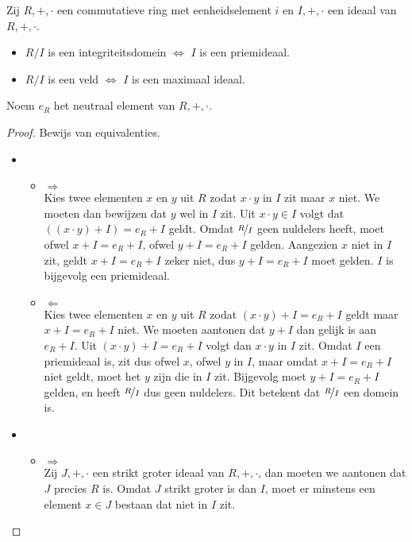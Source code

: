 \documentclass[main.tex]{subfiles}
\begin{document}
\begin{st}
  Zij $R,+,\cdot$ een commutatieve ring met eenheidselement $i$ en $I,+,\cdot$ een ideaal van $R,+,\cdot$.
  \begin{itemize}
  \item $R/I$ is een integriteitsdomein $\Leftrightarrow$ $I$ is een priemideaal.
  \item $R/I$ is een veld $\Leftrightarrow$ $I$ is een maximaal ideaal.
  \end{itemize}
  Noem $e_{R}$ het neutraal element van $R,+,\cdot$.

  \begin{proof}
    Bewijs van equivalenties.
    \begin{itemize}
    \item 
      \begin{itemize}
      \item $\Rightarrow$\\
        Kies twee elementen $x$ en $y$ uit $R$ zodat $x\cdot y$ in $I$ zit maar $x$ niet.
        We moeten dan bewijzen dat $y$ wel in $I$ zit.
        Uit $x\cdot y \in I$ volgt dat $((x\cdot y)+I) = e_{R}+I$ geldt.
        Omdat $\nicefrac{R}{I}$ geen nuldelers heeft, moet ofwel $x+I = e_{R}+I$, ofwel $y+I=e_{R}+I$ gelden.
        Aangezien $x$ niet in $I$ zit, geldt $x+I = e_{R}+I$ zeker niet, dus $y+I=e_{R}+I$ moet gelden.
        $I$ is bijgevolg een priemideaal.
      \item $\Leftarrow$\\
        Kies twee elementen $x$ en $y$ uit $R$ zodat $(x\cdot y)+I = e_{R}+I$ geldt maar $x+I = e_{R}+I$ niet.
        We moeten aantonen dat $y+I$ dan gelijk is aan $e_{R}+I$.
        Uit $(x\cdot y)+I= e_{R}+ I$ volgt dan $x\cdot y$ in $I$ zit.
        Omdat $I$ een priemideaal is, zit dus ofwel $x$, ofwel $y$ in $I$, maar omdat $x+I=e_{R}+I$ niet geldt, moet het $y$ zijn die in $I$ zit.
        Bijgevolg moet $y+I = e_{R}+I$ gelden, en heeft $\nicefrac{R}{I}$ dus geen nuldelers.
        Dit betekent dat $\nicefrac{R}{I}$ een domein is.\waarom
      \end{itemize}
    \item 
      \begin{itemize}
      \item $\Rightarrow$\\
        Zij $J,+,\cdot$ een strikt groter ideaal van $R,+,\cdot$, dan moeten we aantonen dat $J$ precies $R$ is.
        Omdat $J$ strikt groter is dan $I$, moet er minstens een element $x\in J$ bestaan dat niet in $I$ zit.

\end{itemize}
\end{itemize}
\end{proof}
\end{st}
\end{document}
